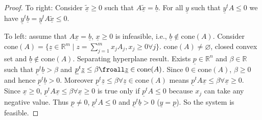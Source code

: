 \begin{proof}
    To right: Consider $\underline{\tilde{x}}\geq 0$ such that $A\underline{\tilde{x}}=\underline{b}$. 
    For all $\underline{y}$ such that $\underline{y}^tA\leq 0$ we have $\underline{y}^t\underline{b}=\underline{y}^tA\underline{\tilde{x}}\leq 0$. 

    To left: assume that $A\underline{x}=\underline{b}$, $\underline{x}\geq 0$ is infeasible, i.e., $\underline{b}\notin\text{cone}(A)$. 
    Consider $\text{cone}(A)=\{\underline{z}\in\mathbb{R}^m\mid z=\sum_{j=1}^m x_jA_j,x_j\geq 0 \forall j\}$. 
    $\text{cone}(A)\neq\varnothing$, closed convex set and $\underline{b}\notin\text{cone}(A)$. 
    Separating hyperplane result. Exists $\underline{p}\in\mathbb{R}^n$ and $\beta\in\mathbb{R}$ such that $\underline{p}^t\underline{b}>\beta$ and $\underline{p}^t\underline{z}\leq \beta \froall\underline{z}\in\text{cone}(A)$. 
    Since $0\in\text{cone}(A)$, $\beta\geq 0$ and hence $\underline{p}^t\underline{b}>0$.
    Moreover $\underline{p}^t\underline{z}\leq\beta\forall\underline{z}\in\text{cone}(A)$
    means $\underline{p}^tA\underline{x}\leq\beta\forall\underline{x}\geq 0$. 
    Since $\underline{x}\geq 0$, $\underline{p}^tA\underline{x}\leq\beta\forall\underline{x}\geq 0$ is true only if $\underline{p}^tA\leq 0$ because $x_j$ can take any negative value.
    Thus $\underline{p}\neq 0$, $\underline{p}^tA\leq 0$ and $\underline{p}^t\underline{b}>0$ ($\underline{y}=\underline{p}$). 
    So the system is feasible. 
\end{proof}
